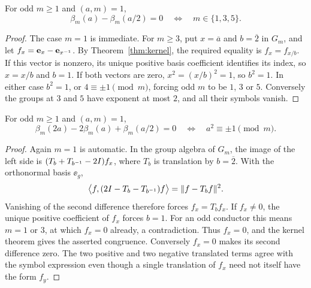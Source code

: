 \begin{lemma}\label{lem:first}
For odd $m\ge1$ and $(a,m)=1$,
\begin{equation}\label{eq:first}
 \beta_m(a)-\beta_m(a/2)=0
 \quad\Longleftrightarrow\quad m\in\{1,3,5\}.
\end{equation}
\end{lemma}
\begin{proof}
The case $m=1$ is immediate. For $m\ge3$, put $x=\overline a$ and
$b=\overline2$ in $G_m$, and let $f_x=\mathbf e_x-\mathbf e_{x^{-1}}$.
By Theorem~\ref{thm:kernel}, the required equality is
$f_x=f_{x/b}$. If this vector is nonzero, its unique positive basis
coefficient identifies its index, so $x=x/b$ and $b=1$. If both
vectors are zero, $x^2=(x/b)^2=1$, so $b^2=1$. In either case
$b^2=1$, or $4\equiv\pm1\pmod m$, forcing odd $m$ to be $1$, $3$
or $5$. Conversely the groups at $3$ and $5$ have exponent at most
$2$, and all their symbols vanish.
\end{proof}

\begin{lemma}\label{lem:second}
For odd $m\ge1$ and $(a,m)=1$,
\begin{equation}\label{eq:second}
 \beta_m(2a)-2\beta_m(a)+\beta_m(a/2)=0
 \quad\Longleftrightarrow\quad a^2\equiv\pm1\pmod m.
\end{equation}
\end{lemma}
\begin{proof}
Again $m=1$ is automatic. In the group algebra of $G_m$, the image of
the left side is $(T_b+T_{b^{-1}}-2I)f_x$, where $T_b$ is translation
by $b=\overline2$. With the orthonormal basis $\ee_g$,
\[
 \big\langle f,(2I-T_b-T_{b^{-1}})f\big\rangle
 =\|f-T_bf\|^2.
\]
Vanishing of the second difference therefore forces $f_x=T_bf_x$.
If $f_x\ne0$, the unique positive coefficient of $f_x$ forces $b=1$.
For an odd conductor this means $m=1$ or $3$, at which $f_x=0$
already, a contradiction. Thus $f_x=0$, and the kernel theorem gives
the asserted congruence. Conversely $f_x=0$ makes its second difference
zero. The two positive and two negative translated terms agree with
the symbol expression even though a single translation of $f_x$ need
not itself have the form $f_y$.
\end{proof}
